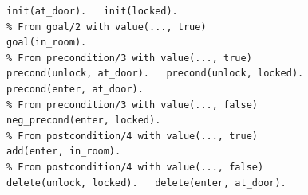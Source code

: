 \begin{lstlisting}[caption={Internal facts derived by the bridge encoding.},label={lst:bridge_result},style=asp]
% From initialState/2 with value(..., true)
init(at_door).   init(locked).
% From goal/2 with value(..., true)
goal(in_room).
% From precondition/3 with value(..., true)
precond(unlock, at_door).   precond(unlock, locked).
precond(enter, at_door).
% From precondition/3 with value(..., false)
neg_precond(enter, locked).
% From postcondition/4 with value(..., true)
add(enter, in_room).
% From postcondition/4 with value(..., false)
delete(unlock, locked).   delete(enter, at_door).
\end{lstlisting}
